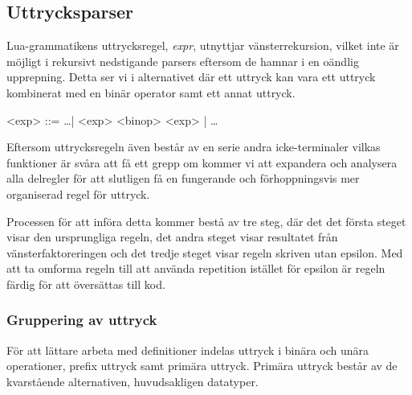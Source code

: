 \subsection{Uttrycksparser}

Lua-grammatikens uttrycksregel, \textit{expr}, utnyttjar vänsterrekursion,
vilket inte är möjligt i rekursivt nedstigande parsers eftersom de hamnar i en
oändlig upprepning. Detta ser vi i alternativet där ett uttryck kan vara ett uttryck
kombinerat med en binär operator samt ett annat uttryck.


\setlength{\grammarindent}{5em}
\begin{grammar}
  \singlespace\small%
  \selectfont
  <exp> ::= \ldots | <exp> <binop> <exp> | \ldots
\end{grammar}

Eftersom uttrycksregeln även består av en serie andra icke-terminaler vilkas
funktioner är svåra att få ett grepp om kommer vi att expandera och analysera
alla delregler för att slutligen få en fungerande och förhoppningsvis mer
organiserad regel för uttryck.

Processen för att införa detta kommer bestå av tre steg, där det det första
steget visar den ursprungliga regeln, det andra steget visar resultatet från
vänsterfaktoreringen och det tredje steget visar regeln skriven utan epsilon.
Med att ta omforma regeln till att använda repetition istället för epsilon är
regeln färdig för att översättas till kod.

\subsubsection{Gruppering av uttryck}

För att lättare arbeta med definitioner indelas uttryck i binära och unära
operationer, prefix uttryck samt primära uttryck. Primära uttryck består av de
kvarstående alternativen, huvudsakligen datatyper.


